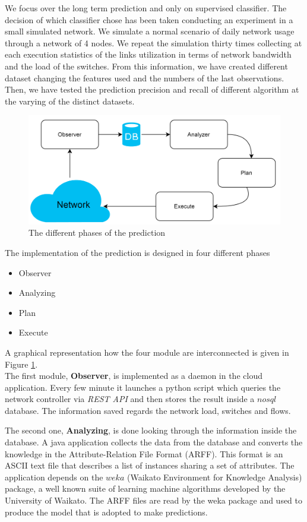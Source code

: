 \documentclass[12pt]{article}
\begin{document}
We focus over the long term prediction and only on supervised classifier.
The decision of which classifier chose has been taken conducting an experiment in a small simulated network. 
We simulate a normal scenario of daily network usage through a network of 4 nodes. 
We repeat the simulation thirty times collecting at each execution statistics of the links utilization in terms of network bandwidth and the load of the switches.
From this information, we have created different dataset changing the features used and the numbers of the last observations.
Then, we have tested the prediction precision and recall of different algorithm at the varying of the distinct datasets. 
\begin{figure}[h!]
	\centering
	\includegraphics[width=1\textwidth]{img/predictionGraph.png}
	\caption[]
	{The different phases of the prediction}
	\label{fig:predictionConf}
\end{figure}


The implementation of the prediction is designed in four different phases
\begin{itemize}
	\item Observer
	\item Analyzing
	\item Plan
	\item Execute
\end{itemize}
A graphical representation how the four module are interconnected is given in Figure \ref{fig:predictionConf}.\\
The first module, \textbf{Observer}, is implemented as a daemon in the cloud application. 
Every few minute it launches a python script which queries the network controller via 	\textit{REST API} and then stores the result inside a $nosql$ database.
The information saved regards the network load, switches and flows.



The second one, \textbf{Analyzing}, is done looking through the information inside the database. 
A java application collects the data from the database and converts the knowledge in the Attribute-Relation File Format (ARFF). 
This format is an ASCII text file that describes a list of instances sharing a set of attributes.
The application depends on the $weka$ (Waikato Environment for Knowledge Analysis) package, a well known suite of learning machine algorithms developed by the University of Waikato.
The ARFF files are read by the weka package and used to produce the model that is adopted to make predictions.
\end{document}
